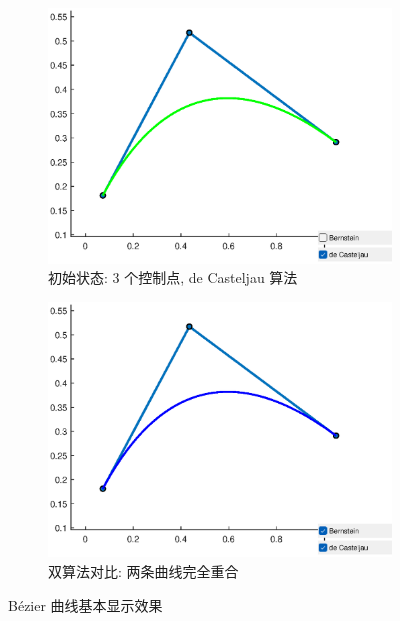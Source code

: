 \documentclass[12pt,a4paper]{report}
\begin{document}
            \begin{figure}[htbp]
                \centering
                \begin{subfigure}{0.45\textwidth}
                    \centering
                    \includegraphics[width=\textwidth]{fig/initial_state.eps}
                    \caption{初始状态: 3 个控制点, de Casteljau 算法}
                \end{subfigure}
                \hfill
                \begin{subfigure}{0.45\textwidth}
                    \centering
                    \includegraphics[width=\textwidth]{fig/both_algorithms.eps}
                    \caption{双算法对比: 两条曲线完全重合}
                \end{subfigure}
                \caption{Bézier 曲线基本显示效果}
            \end{figure}
\end{document}
